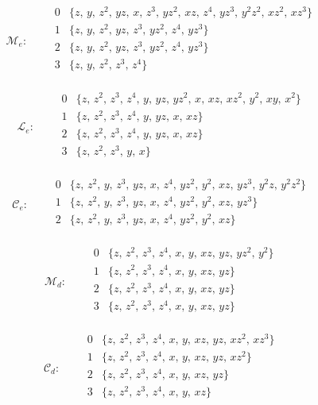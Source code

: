 \documentclass[11pt]{amsart}
\theoremstyle{definition}
\theoremstyle{remark}
\numberwithin{equation}{section}
\begin{document}
\[
\mathcal M_e:\qquad\begin{array}{c|l}
0&\{z,\,y,\,z^{2},\,yz,\,x,\,z^{3},\,yz^{2},\,xz,\,z^{4},\,yz^{3},\,y^{2}z^{2},\,xz^{2},\,xz^{3}\}\\
1&\{z,\,y,\,z^{2},\,yz,\,z^{3},\,yz^{2},\,z^{4},\,yz^{3}\}\\
2&\{z,\,y,\,z^{2},\,yz,\,z^{3},\,yz^{2},\,z^{4},\,yz^{3}\}\\
3&\{z,\,y,\,z^{2},\,z^{3},\,z^{4}\}\\
\end{array}
\]

\[
\mathcal L_e:\qquad\begin{array}{c|l}
0&\{z,\,z^{2},\,z^{3},\,z^{4},\,y,\,yz,\,yz^{2},\,x,\,xz,\,xz^{2},\,y^{2},\,xy,\,x^{2}\}\\
1&\{z,\,z^{2},\,z^{3},\,z^{4},\,y,\,yz,\,x,\,xz\}\\
2&\{z,\,z^{2},\,z^{3},\,z^{4},\,y,\,yz,\,x,\,xz\}\\
3&\{z,\,z^{2},\,z^{3},\,y,\,x\}\\
\end{array}
\]

\[
\mathcal C_e:\qquad\begin{array}{c|l}
0&\{z,\,z^{2},\,y,\,z^{3},\,yz,\,x,\,z^{4},\,yz^{2},\,y^{2},\,xz,\,yz^{3},\,y^{2}z,\,y^{2}z^{2}\}\\
1&\{z,\,z^{2},\,y,\,z^{3},\,yz,\,x,\,z^{4},\,yz^{2},\,y^{2},\,xz,\,yz^{3}\}\\
2&\{z,\,z^{2},\,y,\,z^{3},\,yz,\,x,\,z^{4},\,yz^{2},\,y^{2},\,xz\}\\
\end{array}
\]

\[
\mathcal M_d:\qquad\begin{array}{c|l}
0&\{z,\,z^{2},\,z^{3},\,z^{4},\,x,\,y,\,xz,\,yz,\,yz^{2},\,y^{2}\}\\
1&\{z,\,z^{2},\,z^{3},\,z^{4},\,x,\,y,\,xz,\,yz\}\\
2&\{z,\,z^{2},\,z^{3},\,z^{4},\,x,\,y,\,xz,\,yz\}\\
3&\{z,\,z^{2},\,z^{3},\,z^{4},\,x,\,y,\,xz,\,yz\}\\
\end{array}
\]

\[
\mathcal C_d:\qquad\begin{array}{c|l}
0&\{z,\,z^{2},\,z^{3},\,z^{4},\,x,\,y,\,xz,\,yz,\,xz^{2},\,xz^{3}\}\\
1&\{z,\,z^{2},\,z^{3},\,z^{4},\,x,\,y,\,xz,\,yz,\,xz^{2}\}\\
2&\{z,\,z^{2},\,z^{3},\,z^{4},\,x,\,y,\,xz,\,yz\}\\
3&\{z,\,z^{2},\,z^{3},\,z^{4},\,x,\,y,\,xz\}\\
\end{array}
\]
\end{document}
